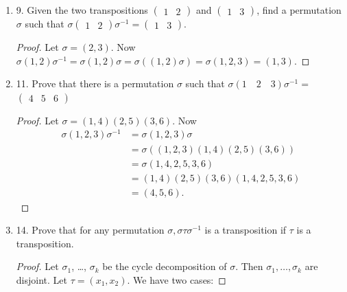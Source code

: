 \begin{enumerate}[resume]
(f) $\left(\begin{array}{lllll}1 & 2 & 3 & 4 & 5\end{array}\right)^3$.
\begin{proof}[Solution]
	$(1,4,2,5,3)$. It has order $5$.
\end{proof}

\item 9. Given the two transpositions $\left(\begin{array}{ll}1 & 2\end{array}\right)$ and $\left(\begin{array}{ll}1 & 3\end{array}\right)$, find a permutation $\sigma$ such that $\sigma\left(\begin{array}{ll}1 & 2\end{array}\right) \sigma^{-1}=\left(\begin{array}{ll}1 & 3\end{array}\right)$.
\begin{proof}
	Let $\sigma = (2,3)$. Now
	$\sigma (1,2) \sigma^{-1} = \sigma(1,2)\sigma = \sigma((1,2)\sigma) = \sigma(1,2,3) = (1,3)$.
\end{proof}
\item 11. Prove that there is a permutation $\sigma$ such that $\sigma(1 \quad 2 \quad 3) \sigma^{-1}=$ $\left(\begin{array}{lll}4 & 5 & 6\end{array}\right)$
\begin{proof}
	Let $\sigma = (1,4)(2,5)(3,6)$. Now
	\begin{align*}
		\sigma(1,2,3)\sigma^{-1} 
		&= \sigma(1,2,3)\sigma \\
		&= \sigma((1,2,3)(1,4)(2,5)(3,6)) \\
		&= \sigma(1,4,2,5,3,6) \\
		&= (1,4)(2,5)(3,6)(1,4,2,5,3,6)\\
		&= (4,5,6)
	.\end{align*}
\end{proof}


\item 14. Prove that for any permutation $\sigma, \sigma \tau \sigma^{-1}$ is a transposition if $\tau$ is a transposition.
\begin{proof}

	Let $\sigma_1$, \ldots, $\sigma_k$ be the cycle decomposition of $\sigma$. Then $\sigma_1, \ldots, \sigma_k$ are disjoint. Let $\tau = (x_1,x_2)$. We have two cases:


\end{proof}
\end{enumerate}
